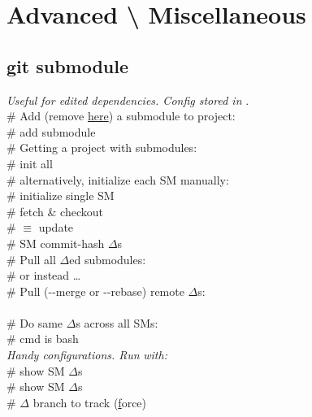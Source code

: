 \section{Advanced \textbackslash \hspace{1mm} Miscellaneous}

\subsection*{git submodule}
\textit{Useful for edited dependencies. Config stored in }.\\
\# Add (remove \href{https://stackoverflow.com/questions/1260748/how-do-i-remove-a-submodule}{here}) a submodule to project:\\
 \# add submodule \\
\# Getting a project with submodules:\\
 \# init all\\
\# alternatively, initialize each SM manually:\\
 \# initialize single SM \\
 \# fetch \& checkout \\
 \# $\equiv$ update \\
 \# SM commit-hash $\Delta$s \\
\# Pull all $\Delta$ed submodules:\\
 \# or instead \dots \\
\# Pull (-{}-merge or -{}-rebase) remote $\Delta$s:\\
\\
\# Do same $\Delta$s across all SMs:\\
 \# cmd is bash \\[1mm]
\textit{Handy configurations. Run }\textit{ with:}\\
 \# show SM $\Delta$s \\
 \# show SM $\Delta$s \\
 \# $\Delta$ branch to track (\ul{f}orce) \\
